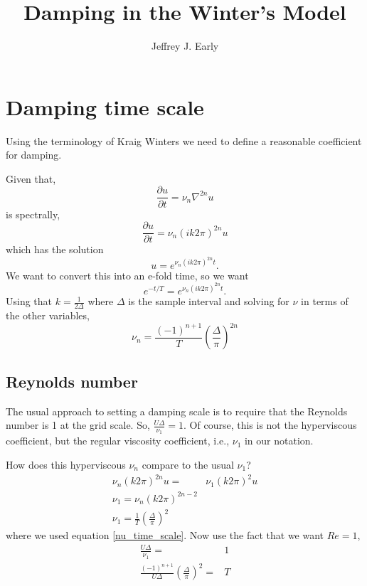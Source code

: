 \documentclass[11pt, oneside]{article}   	%
\title{Damping in the Winter's Model}
\author{Jeffrey J. Early}
\begin{document}
\maketitle
%
\section{Damping time scale}
%
Using the terminology of Kraig Winters we need to define a reasonable coefficient for damping.

Given that,
\begin{equation}
\frac{\partial u}{\partial t} = \nu_n \nabla^{2n} u
\end{equation}
is spectrally,
\begin{equation}
\frac{\partial u}{\partial t} = \nu_n (i k 2 \pi)^{2n} u
\end{equation}
which has the solution
\begin{equation}
u = e^{\nu_n (i k 2 \pi)^{2n} t}.
\end{equation}
We want to convert this into an e-fold time, so we want
\begin{equation}
e^{-t/T}=e^{\nu_n (i k 2 \pi)^{2n} t}.
\end{equation}
Using that $k=\frac{1}{2\Delta}$ where $\Delta$ is the sample interval and solving for $\nu$ in terms of the other variables,
\begin{equation}
\label{nu_time_scale}
\nu _n= \frac{(-1)^{n+1}}{T} \left( \frac{\Delta}{\pi} \right)^{2n}
\end{equation}

\subsection{Reynolds number}
The usual approach to setting a damping scale is to require that the Reynolds number is 1 at the grid scale. So, $\frac{U\Delta}{\nu_1}=1$. Of course, this is not the hyperviscous coefficient, but the regular viscosity coefficient, i.e., $\nu_1$ in our notation.

How does this hyperviscous $\nu_n$ compare to the usual $\nu_1$?
\begin{align}
\nu_n (k 2 \pi)^{2n} u =& \nu_1 (k 2 \pi)^{2} u \\
\nu_1 = \nu_n (k 2 \pi)^{2n-2}  \\
\nu_1= \frac{1}{T} \left( \frac{\Delta}{\pi} \right)^{2}
\end{align}
where we used equation \ref{nu_time_scale}. Now use the fact that we want $Re=1$,
\begin{align}
 \frac{U \Delta}{\nu_1} =& 1\\
\frac{(-1)^{n+1}}{U \Delta} \left( \frac{\Delta}{\pi} \right)^{2} =& T
\end{align}
\end{document}
